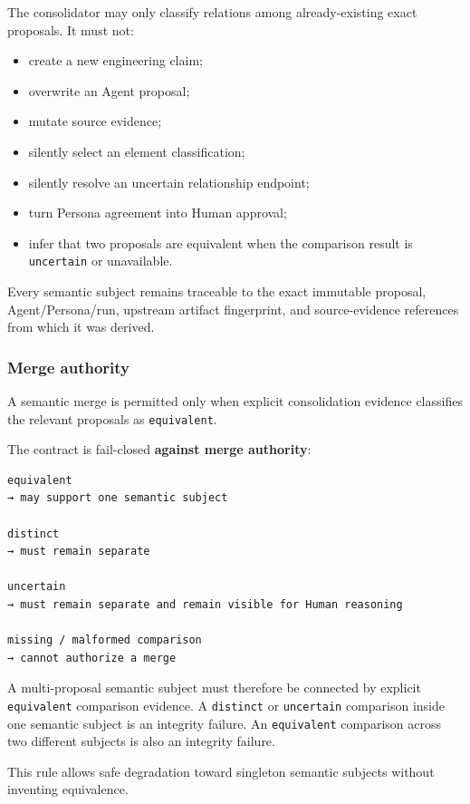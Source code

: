 The consolidator may only classify relations among already-existing exact proposals. It must not:

\begin{itemize}
\tightlist
\item
  create a new engineering claim;
\item
  overwrite an Agent proposal;
\item
  mutate source evidence;
\item
  silently select an element classification;
\item
  silently resolve an uncertain relationship endpoint;
\item
  turn Persona agreement into Human approval;
\item
  infer that two proposals are equivalent when the comparison result is \texttt{uncertain} or unavailable.
\end{itemize}

Every semantic subject remains traceable to the exact immutable proposal, Agent/Persona/run, upstream artifact fingerprint, and source-evidence references from which it was derived.

\hypertarget{merge-authority}{%
\subsubsection{Merge authority}\label{merge-authority}}

A semantic merge is permitted only when explicit consolidation evidence classifies the relevant proposals as \texttt{equivalent}.

The contract is fail-closed \textbf{against merge authority}:

\begin{verbatim}
equivalent
→ may support one semantic subject

distinct
→ must remain separate

uncertain
→ must remain separate and remain visible for Human reasoning

missing / malformed comparison
→ cannot authorize a merge
\end{verbatim}

A multi-proposal semantic subject must therefore be connected by explicit \texttt{equivalent} comparison evidence. A \texttt{distinct} or \texttt{uncertain} comparison inside one semantic subject is an integrity failure. An \texttt{equivalent} comparison across two different subjects is also an integrity failure.

This rule allows safe degradation toward singleton semantic subjects without inventing equivalence.


